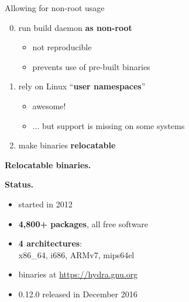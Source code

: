 \documentclass{beamer}
\newcommand{\highlight}[1]{\alert{\textbf{#1}}}
\begin{document}
\begin{frame}{Allowing for non-root usage}

  \Large{
    \begin{enumerate}
      \setcounter{enumi}{-1}
    \item {run build daemon \highlight{as non-root}
      \begin{itemize}
        \item<2-> not reproducible
        \item<2-> prevents use of pre-built binaries
    \end{itemize}}
    \item {rely on Linux ``\highlight{user namespaces}''
      \begin{itemize}
        \item<3-> awesome!
        \item<3-> ... but support is missing on some systems
    \end{itemize}}
    \item make binaries \highlight{relocatable}
    \end{enumerate}
  }
\end{frame}

\begin{frame}
  \Huge{\textbf{Relocatable binaries.}}
\end{frame}



\begin{frame}[plain]
  \Huge{\textbf{Status.}}
\end{frame}

\begin{frame}
  \Large{
  \begin{itemize}
    \item started in 2012
    \item \highlight{4,800+ packages}, all free software
    \item \highlight{4 architectures}:\\
      x86\_64, i686, ARMv7, mips64el
    \item binaries at \url{https://hydra.gnu.org}
    \item 0.12.0 released in December 2016
  \end{itemize}
  }
\end{frame}
\end{document}
